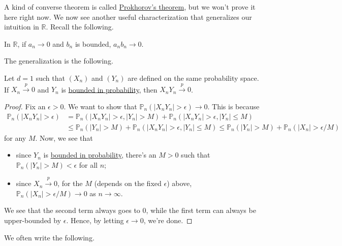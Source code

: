 A kind of converse theorem is called \hyperref[thm:Prokhorov]{Prokhorov's theorem}, but we won't prove it here right now. We now see another useful characterization that generalizes our intuition in \(\mathbb{R} \). Recall the following.

\begin{prev}
	In \(\mathbb{R} \), if \(a_n \to 0\) and \(b_n\) is bounded, \(a_n b_n \to 0\).
\end{prev}

The generalization is the following.

\begin{proposition}\label{prop:op(1)xOp(1)=op(1)}
	Let \(d = 1\) such that \((X_n)\) and \((Y_n)\) are defined on the same probability space. If \(X_n \overset{p}{\to } 0\) and \(Y_n\) is \hyperref[def:bounded-in-probability]{bounded in probability}, then \(X_n Y_n \overset{p}{\to } 0\).
\end{proposition}
\begin{proof}
	Fix an \(\epsilon > 0\). We want to show that \(\mathbb{P} _{n}(\vert X_n Y_n \vert > \epsilon ) \to 0\). This is because
	\[
		\begin{split}
			\mathbb{P} _{n}(\vert X_n Y_n \vert > \epsilon )
			 & = \mathbb{P} _{n}(\vert X_n Y_n \vert > \epsilon , \vert Y_n \vert > M) + \mathbb{P} _{n}(\vert X_n Y_n \vert > \epsilon , \vert Y_n \vert \leq M) \\
			 & \leq \mathbb{P} _{n}(\vert Y_n \vert > M) + \mathbb{P} _{n}(\vert X_n Y_n \vert > \epsilon , \vert Y_n \vert \leq M)
			\leq \mathbb{P} _{n}(\vert Y_n \vert > M ) + \mathbb{P} _{n}(\vert X_n \vert > \epsilon / M)
		\end{split}
	\]
	for any \(M\). Now, we see that
	\begin{itemize}
		\item since \(Y_n\) is \hyperref[def:bounded-in-probability]{bounded in probability}, there's an \(M > 0\) such that \(\mathbb{P} _{n}(\vert Y_n \vert > M) < \epsilon \) for all \(n\);
		\item since \(X_n \overset{p}{\to } 0\), for the \(M\) (depends on the fixed \(\epsilon \)) above, \(\mathbb{P} _{n}(\vert X_n \vert > \epsilon / M) \to 0\) as \(n \to \infty \).
	\end{itemize}
	We see that the second term always goes to \(0\), while the first term can always be upper-bounded by \(\epsilon \). Hence, by letting \(\epsilon \to 0\), we're done.
\end{proof}

We often write the following.

